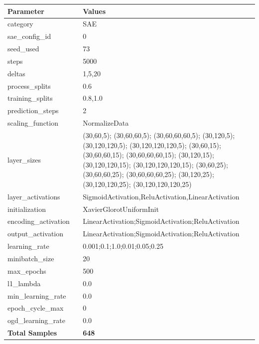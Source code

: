 \documentclass[a4paper,11pt,oneside]{article}
\theoremstyle{plain}
\theoremstyle{definition}
\begin{document}
	\begin{longtable}[H]{|p{0.3\linewidth}|p{0.7\linewidth}|} \hline \textbf{Parameter} &\textbf{Values} \\\hline{category} & {SAE} \\\hline
		{sae\_config\_id} & {0} \\\hline
		{seed\_used} & {73} \\\hline
		{steps} & {5000} \\\hline
		{deltas} & {1,5,20} \\\hline
		{process\_splits} & {0.6} \\\hline
		{training\_splits} & {0.8,1.0} \\\hline
		{prediction\_steps} & {2} \\\hline
		{scaling\_function} & {NormalizeData} \\\hline
		{layer\_sizes} & {(30,60,5); (30,60,60,5); (30,60,60,60,5); (30,120,5); (30,120,120,5); (30,120,120,120,5); (30,60,15); (30,60,60,15); (30,60,60,60,15); (30,120,15); (30,120,120,15); (30,120,120,120,15); (30,60,25); (30,60,60,25); (30,60,60,60,25); (30,120,25); (30,120,120,25); (30,120,120,120,25)} \\\hline
		{layer\_activations} & {SigmoidActivation,ReluActivation,LinearActivation} \\\hline
		{initialization} & {XavierGlorotUniformInit} \\\hline
		{encoding\_activation} & {LinearActivation;SigmoidActivation;ReluActivation} \\\hline
		{output\_activation} & {LinearActivation;SigmoidActivation;ReluActivation} \\\hline
		{learning\_rate} & {0.001;0.1;1.0;0.01;0.05;0.25} \\\hline
		{minibatch\_size} & {20} \\\hline
		{max\_epochs} & {500} \\\hline
		{l1\_lambda} & {0.0} \\\hline
		{min\_learning\_rate} & {0.0} \\\hline
		{epoch\_cycle\_max} & {0} \\\hline
		{ogd\_learning\_rate} & {0.0} \\\hline
		{\textbf{Total Samples}} & {\textbf{648}} \\\hline
	\end{longtable}
	
	\newpage
\end{document}
